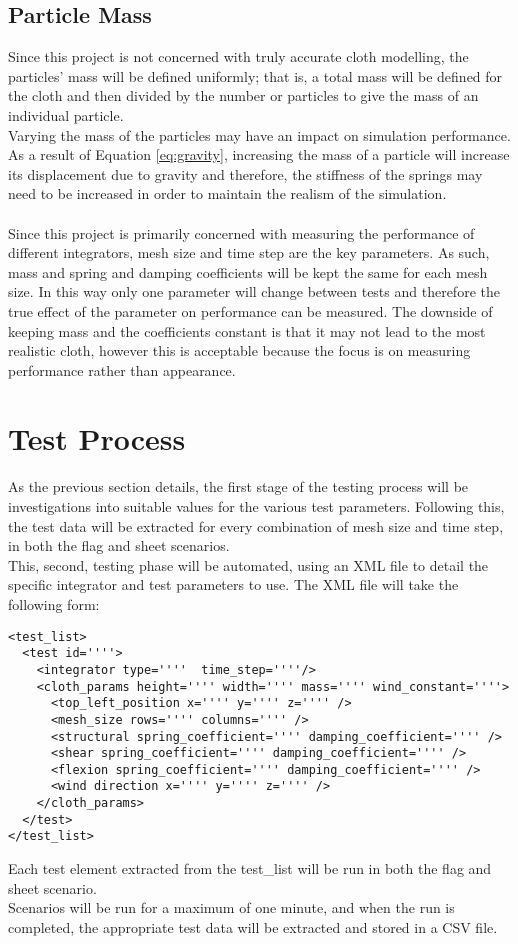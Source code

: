 \subsection{Particle Mass}
Since this project is not concerned with truly accurate cloth modelling, the particles' mass will be defined uniformly; that is, a total mass will be defined for the cloth and then divided by the number or particles to give the mass of an individual particle.
\\Varying the mass of the particles may have an impact on simulation performance. As a result of Equation \ref{eq:gravity}, increasing the mass of a particle will increase its displacement due to gravity and therefore, the stiffness of the springs may need to be increased in order to maintain the realism of the simulation. 
\\\\Since this project is primarily concerned with measuring the performance of different integrators, mesh size and time step are the key parameters. As such, mass and spring and damping coefficients will be kept the same for each mesh size. In this way only one parameter will change between tests and therefore the true effect of the parameter on performance can be measured. The downside of keeping mass and the coefficients  constant is that it may not lead to the most realistic cloth, however this is acceptable because the focus is on measuring performance rather than appearance.

\section{Test Process}
As the previous section details, the first stage of the testing process will be investigations into suitable values for the various test parameters. Following this, the test data will be extracted for every combination of mesh size and time step, in both the flag and sheet scenarios.
\\This, second, testing phase will be automated, using an XML file to detail the specific integrator and test parameters to use. The XML file will take the following form:
\begin{lstlisting}
<test_list>
  <test id=''''>
    <integrator type=''''  time_step=''''/>
    <cloth_params height='''' width='''' mass='''' wind_constant=''''>
      <top_left_position x='''' y='''' z='''' />
      <mesh_size rows='''' columns='''' />
      <structural spring_coefficient='''' damping_coefficient='''' />
      <shear spring_coefficient='''' damping_coefficient='''' />
      <flexion spring_coefficient='''' damping_coefficient='''' />
      <wind direction x='''' y='''' z='''' />
    </cloth_params>
  </test>
</test_list>
\end{lstlisting}
Each test element extracted from the test\_list will be run in both the flag and sheet scenario.
\\Scenarios will be run for a maximum of one minute, and when the run is completed, the appropriate test data will be extracted and stored in a CSV file.